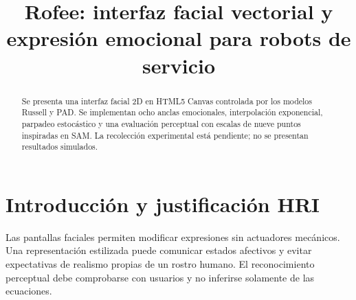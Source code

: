 \documentclass[conference]{IEEEtran}
\title{Rofee: interfaz facial vectorial y expresión emocional para robots de servicio}
\author{\IEEEauthorblockN{[Nombre del estudiante]}\IEEEauthorblockA{Ingeniería en Robótica de Servicio\\ Universidad Iberoamericana}}
\begin{document}
\maketitle
\begin{abstract}
Se presenta una interfaz facial 2D en HTML5 Canvas controlada por los modelos Russell y PAD. Se implementan ocho anclas emocionales, interpolación exponencial, parpadeo estocástico y una evaluación perceptual con escalas de nueve puntos inspiradas en SAM. La recolección experimental está pendiente; no se presentan resultados simulados.
\end{abstract}
\section{Introducción y justificación HRI}
Las pantallas faciales permiten modificar expresiones sin actuadores mecánicos. Una representación estilizada puede comunicar estados afectivos y evitar expectativas de realismo propias de un rostro humano. El reconocimiento perceptual debe comprobarse con usuarios y no inferirse solamente de las ecuaciones.
\end{document}
